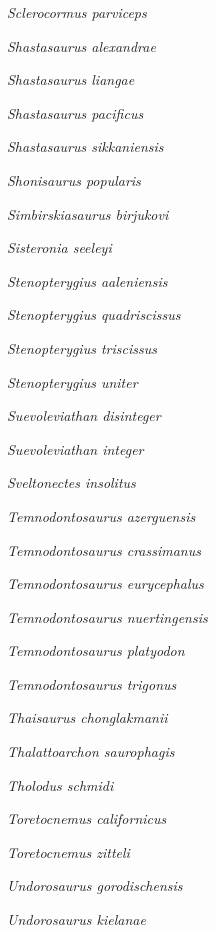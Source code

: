 \emph{Sclerocormus parviceps} \cite{Jiang2016SR}

\emph{Shastasaurus alexandrae} \cite{Merriam1902UCBDG}

\emph{Shastasaurus liangae} \cite{Yin2000GG}

\emph{Shastasaurus pacificus} \cite{Merriam1895AJS}

\emph{Shastasaurus sikkaniensis} \cite{Nicholls2004JVP}

\emph{Shonisaurus popularis} \cite{Camp1976SOeAW}

\emph{Simbirskiasaurus birjukovi} \cite{Otschev1985PZ}

\emph{Sisteronia seeleyi} \cite{Fischer2014PO}

\emph{Stenopterygius aaleniensis} \cite{Maxwell2012PO}

\emph{Stenopterygius quadriscissus} \cite{Quenstedt1858}

\emph{Stenopterygius triscissus} \cite{Quenstedt1858}

\emph{Stenopterygius uniter} \cite{vonHuene1931ASNG}

\emph{Suevoleviathan disinteger} \cite{vonHuene1926NJFMGPBBB}

\emph{Suevoleviathan integer} \cite{Bronn1844NJMGGP}

\emph{Sveltonectes insolitus} \cite{Fischer2011JVP}

\emph{Temnodontosaurus azerguensis} \cite{Martin2012P}

\emph{Temnodontosaurus crassimanus} \cite{Blake1876}

\emph{Temnodontosaurus eurycephalus} \cite{McGowan1974LSCROM}

\emph{Temnodontosaurus nuertingensis} \cite{vonHuene1931NJFMGPBB}

\emph{Temnodontosaurus platyodon} \cite{Conybeare1822TGSL}

\emph{Temnodontosaurus trigonus} \cite{Theodori1843GAKAWMC}

\emph{Thaisaurus chonglakmanii} \cite{Mazin1991CRASS2MPCSUST}

\emph{Thalattoarchon saurophagis} \cite{Frobisch2013PNAS}

\emph{Tholodus schmidi} \cite{Meyer1849P}

\emph{Toretocnemus californicus} \cite{Merriam1903UCBDG}

\emph{Toretocnemus zitteli} \cite{Merriam1903UCBDG}

\emph{Undorosaurus gorodischensis} \cite{Efimov1999PZa}

\emph{Undorosaurus kielanae} \cite{Tyborowski2016APP}

